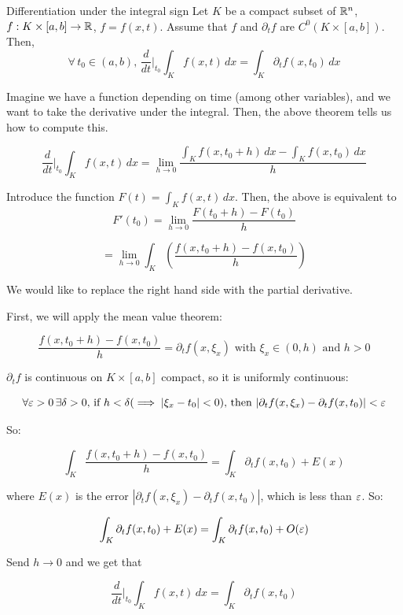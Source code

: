 \documentclass[12pt]{article}
\begin{document}
\begin{theorem}{Differentiation under the integral sign}{}
Let $K$ be a compact subset of $\mathbb{R}^n$, $f: K \times [a, b] \rightarrow \mathbb{R}$, $f = f(x, t)$. Assume that $f$ and $\partial_t f$ are $C^0(K \times [a, b])$. Then, 
$$
\forall \, t_0 \in (a, b), \, \frac{d}{dt} |_{t_0} \int_{K} f(x, t) \,dx = \int_{K} \partial_t f(x, t_0) \,dx
$$
\end{theorem}

Imagine we have a function depending on time (among other variables), and we want to take the derivative under the integral. Then, the above theorem tells us how to compute this.

\begin{proofbox}
$$
\frac{d}{dt} |_{t_0} \int_{K} f(x, t) \,dx = \lim_{h \rightarrow 0} \frac{\int_{K} f(x, t_0+h) \,dx - \int_{K} f(x, t_0) \,dx}{h}
$$

Introduce the function $F(t) = \int_{K} f(x, t) \,dx$. Then, the above is equivalent to 
$$
F'(t_0) = \lim_{h \rightarrow 0}\frac{F(t_0 + h) - F(t_0)}{h}
$$

$$
= \lim_{h \rightarrow 0} \int_{K} \left(\frac{f(x, t_0+h) - f(x, t_0)}{h}\right)
$$

We would like to replace the right hand side with the partial derivative.

First, we will apply the mean value theorem:

$$
\frac{f(x, t_0+h) - f(x, t_0)}{h} = \partial_t f(x, \xi_x) \text{ with } \xi_x \in (0, h) \text{ and } h > 0
$$

$\partial_t f$ is continuous on $K \times [a, b]$ compact, so it is uniformly continuous:

$$
\forall \varepsilon > 0 \, \exists \delta > 0 \text{, if } h < \delta (\implies |\xi_x - t_0| < 0) \text{, then } |\partial_t f(x, \xi_x) - \partial_t f(x, t_0)| < \varepsilon
$$

So: 

$$
\int_{K} \frac{f(x, t_0+h) - f(x, t_0)}{h} = \int_{K} \partial_t f(x, t_0) + E(x)
$$

where $E(x)$ is the error $|\partial_t f(x, \xi_x) - \partial_t f(x, t_0)|$, which is less than $\varepsilon$. So:

$$
\int_{K} \partial_t f(x, t_0) + E(x) = \int_{K} \partial_t f(x, t_0) + O(\varepsilon)
$$

Send $h \rightarrow 0$ and we get that

$$
\frac{d}{dt} |_{t_0} \int_{K} f(x, t) \,dx = \int_{K} \partial_t f(x, t_0)
$$
\end{proofbox}
\end{document}
